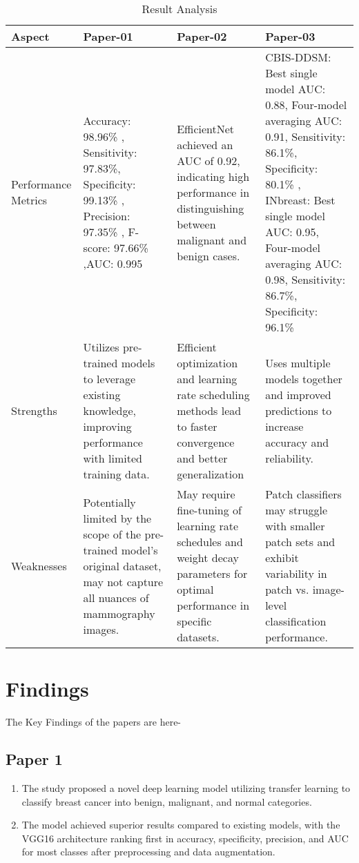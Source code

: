 \documentclass[12]{article}
\begin{document}
\begin{table}[!ht]
\centering
\caption{Result Analysis}
\label{tab:Performance Metrics}
\begin{tabular}{||p{2.5cm}|p{4cm}|p{3cm}|p{2cm}||}
\hline
\textbf{Aspect} & \textbf{Paper-01} & \textbf{Paper-02} & \textbf{Paper-03} \\ 
\hline\hline
Performance Metrics
 & Accuracy: 98.96\% , Sensitivity: 97.83\%, Specificity: 99.13\% , Precision: 97.35\% , F-score: 97.66\% ,AUC: 0.995

 & EfficientNet achieved an AUC of 0.92, indicating high performance in distinguishing between malignant and benign cases.

 & CBIS-DDSM: Best single model AUC: 0.88, Four-model averaging AUC: 0.91, Sensitivity: 86.1\%, Specificity: 80.1\% , INbreast: Best single model AUC: 0.95, Four-model averaging AUC: 0.98, Sensitivity: 86.7\%, Specificity: 96.1\%
\\ 
\hline
Strengths

 & Utilizes pre-trained models to leverage existing knowledge, improving performance with limited training data.

 & Efficient optimization and learning rate scheduling methods lead to faster convergence and better generalization
 & Uses multiple models together and improved predictions to increase accuracy and reliability.
 \\ 
\hline
 Weaknesses

& Potentially limited by the scope of the pre-trained model's original dataset, may not capture all nuances of mammography images.

& May require fine-tuning of learning rate schedules and weight decay parameters for optimal performance in specific datasets.

 & Patch classifiers may struggle with smaller patch sets and exhibit variability in patch vs. image-level classification performance.
\\ 
\hline
\end{tabular}
\end{table}

\newpage

\section{Findings}
The Key Findings of the papers are here-
\subsection{Paper 1}
\begin{enumerate}
    \item The study proposed a novel deep learning model utilizing transfer learning to classify breast cancer into benign, malignant, and normal categories.
    \item The model achieved superior results compared to existing models, with the VGG16 architecture ranking first in accuracy, specificity, precision, and AUC for most classes after preprocessing and data augmentation.
\end{enumerate}
\end{document}
